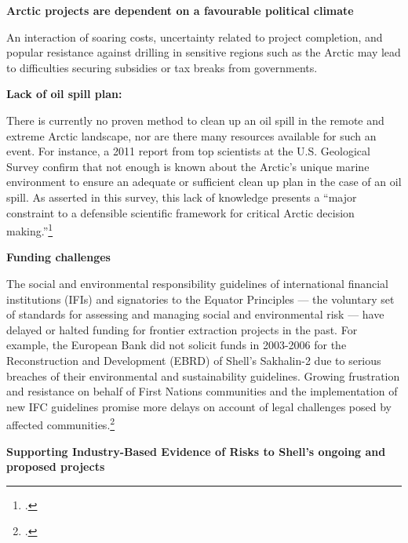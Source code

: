 \textbf{Arctic projects are dependent on a favourable political climate}



An interaction of soaring costs, uncertainty related to project completion, and popular resistance against drilling in sensitive regions such as the Arctic may lead to difficulties securing subsidies or tax breaks from governments.



\textbf{Lack of oil spill plan:}



There is currently no proven method to clean up an oil spill in the remote and extreme Arctic landscape, nor are there many resources available for such an event. 
For instance, a 2011 report from top scientists at the U.S. Geological Survey confirm that not enough is known about the Arctic’s unique marine environment to ensure an adequate or sufficient clean up plan in the case of an oil spill. 
As asserted in this survey, this lack of knowledge presents a ``major constraint to a defensible scientific framework for critical Arctic decision making.''\footcite[][]{Holland-BartelsPierce_2011}



\textbf{Funding challenges}



The social and environmental responsibility guidelines of international financial institutions (IFIs) and signatories to the Equator Principles --- the voluntary set of standards for assessing and managing social and environmental risk --- have delayed or halted funding for frontier extraction projects in the past. 
For example, the European Bank did not solicit funds in 2003-2006 for the Reconstruction and Development (EBRD) of Shell’s Sakhalin-2 due to serious breaches of their environmental and sustainability guidelines. 
Growing frustration and resistance on behalf of First Nations communities and the implementation of new IFC guidelines promise more delays on account of legal challenges posed by affected communities.\footcite[][]{Mathiason_2005}



\textbf{Supporting Industry-Based Evidence of Risks to Shell’s ongoing and proposed projects}



